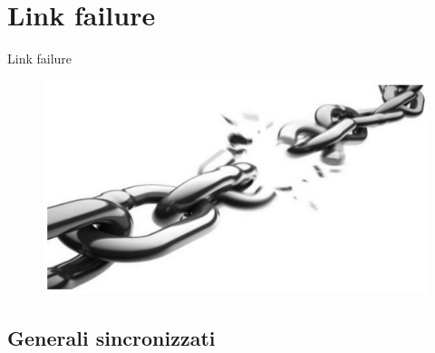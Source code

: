 \section{Link failure}

	\logo{}

	\begin{frame}
		\begin{center}
			\Huge{Link failure}
		\end{center}
		\begin{center}
			\begin{figure}
				\includegraphics[width=.9\textwidth]{img/link2}
			\end{figure}
		\end{center}
	\end{frame}

	\subsection{Generali sincronizzati}
	
	

